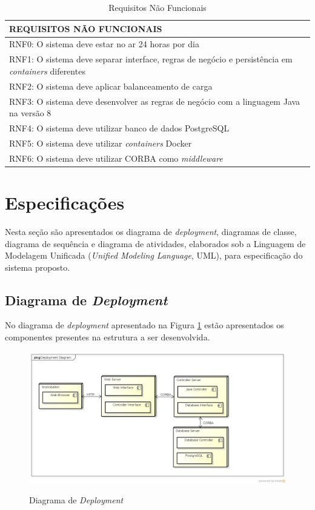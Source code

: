 	\begin{table}[!h]
		\caption{Requisitos Não Funcionais}
		\label{Req-Nao-Func}
		\begin{tabular}{|l|}
			\hline
			\textbf{REQUISITOS NÃO FUNCIONAIS} \\ \hline
			RNF0: O sistema deve estar no ar 24 horas por dia \\ \hline
			RNF1: O sistema deve separar interface, regras de negócio e persistência em \textit{containers} diferentes \\ \hline
			RNF2: O sistema deve aplicar balanceamento de carga \\ \hline
			RNF3: O sistema deve desenvolver as regras de negócio com a linguagem Java na versão 8\\ \hline
			RNF4: O sistema deve utilizar banco de dados PostgreSQL \\ \hline
			RNF5: O sistema deve utilizar \textit{containers} Docker \\ \hline
			RNF6: O sistema deve utilizar CORBA como \textit{middleware} \\ \hline
		\end{tabular}
	\end{table}

\section{Especificações}
	Nesta seção são apresentados os diagrama de \textit{deployment}, diagramas de classe, diagrama de sequência e diagrama de atividades, elaborados sob a Linguagem de Modelagem Unificada (\textit{Unified Modeling Language}, UML), para especificação do sistema proposto.
	
\subsection{Diagrama de \textit{Deployment}}
	No diagrama de \textit{deployment} apresentado na Figura \ref{Diagrama-Deployment} estão apresentados os componentes presentes na estrutura a ser desenvolvida.
	
	\begin{figure}[htb]
		\caption{Diagrama de \textit{Deployment}}
		{\parbox{6cm}{
				\includegraphics[width=14cm]{images/DeploymentDiagram.png}
				\label{Diagrama-Deployment}
		}}
	\end{figure}

